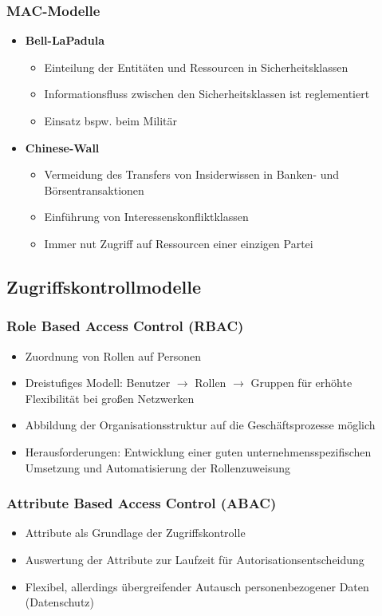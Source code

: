 \subsubsection{MAC-Modelle}
\begin{itemize}
	\item \textbf{Bell-LaPadula}
	\begin{itemize}
		\item Einteilung der Entitäten und Ressourcen in Sicherheitsklassen
		\item Informationsfluss zwischen den Sicherheitsklassen ist reglementiert
		\item Einsatz bspw. beim Militär
	\end{itemize}
	\item \textbf{Chinese-Wall}
	\begin{itemize}
		\item Vermeidung des Transfers von Insiderwissen in Banken- und Börsentransaktionen
		\item Einführung von Interessenskonfliktklassen
		\item Immer nut Zugriff auf Ressourcen einer einzigen Partei
	\end{itemize}
\end{itemize}


\subsection{Zugriffskontrollmodelle}

\subsubsection{Role Based Access Control (RBAC)}
\begin{itemize}
	\item Zuordnung von Rollen auf Personen
	\item Dreistufiges Modell: Benutzer $\rightarrow$ Rollen $\rightarrow$ Gruppen für erhöhte Flexibilität bei großen Netzwerken
	\item Abbildung der Organisationsstruktur auf die Geschäftsprozesse möglich
	\item Herausforderungen: Entwicklung einer guten unternehmensspezifischen Umsetzung und Automatisierung der Rollenzuweisung
\end{itemize}

\subsubsection{Attribute Based Access Control (ABAC)}
\begin{itemize}
	\item Attribute als Grundlage der Zugriffskontrolle
	\item Auswertung der Attribute zur Laufzeit für Autorisationsentscheidung
	\item Flexibel, allerdings übergreifender Autausch personenbezogener Daten (Datenschutz)
\end{itemize}


